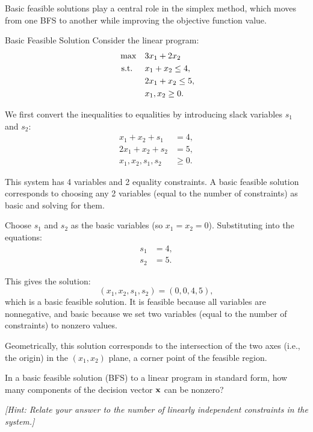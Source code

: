 \noindent Basic feasible solutions play a central role in the simplex method, which moves from one BFS to another while improving the objective function value.

\begin{example}{Basic Feasible Solution}\label{exa:bfs-2d-example}
Consider the linear program:
\[
\begin{aligned}
\max \quad & 3x_1 + 2x_2 \\
\mbox{ s.t. } \quad
& x_1 + x_2 \leq 4, \\
& 2x_1 + x_2 \leq 5, \\
& x_1, x_2 \geq 0.
\end{aligned}
\]

We first convert the inequalities to equalities by introducing slack variables \( s_1 \) and \( s_2 \):
\[
\begin{aligned}
x_1 + x_2 + s_1 &= 4, \\
2x_1 + x_2 + s_2 &= 5, \\
x_1, x_2, s_1, s_2 &\geq 0.
\end{aligned}
\]

This system has 4 variables and 2 equality constraints. A basic feasible solution corresponds to choosing any 2 variables (equal to the number of constraints) as basic and solving for them.

Choose \( s_1 \) and \( s_2 \) as the basic variables (so \( x_1 = x_2 = 0 \)). Substituting into the equations:
\[
\begin{aligned}
s_1 &= 4, \\
s_2 &= 5.
\end{aligned}
\]

This gives the solution:
\[
(x_1, x_2, s_1, s_2) = (0, 0, 4, 5),
\]
which is a basic feasible solution. It is feasible because all variables are nonnegative, and basic because we set two variables (equal to the number of constraints) to nonzero values.

\smallskip

Geometrically, this solution corresponds to the intersection of the two axes (i.e., the origin) in the \( (x_1, x_2) \) plane, a corner point of the feasible region.
\end{example}

\begin{learningcheckpoint}[label={lc:bfs-nonzero}]
In a basic feasible solution (BFS) to a linear program in standard form, how many components of the decision vector \(\mathbf{x}\) can be nonzero?

\emph{[Hint: Relate your answer to the number of linearly independent constraints in the system.]}
\end{learningcheckpoint}


